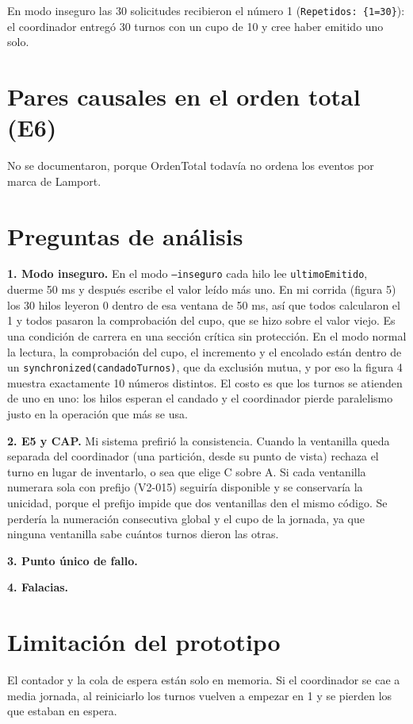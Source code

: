 \documentclass[11pt,a4paper]{article}
\begin{document}
En modo inseguro las 30 solicitudes recibieron el número 1 (\texttt{Repetidos: \{1=30\}}): el coordinador entregó 30 turnos con un cupo de 10 y cree haber emitido uno solo.

\section*{Pares causales en el orden total (E6)}

No se documentaron, porque OrdenTotal todavía no ordena los eventos por marca de Lamport.

\section*{Preguntas de análisis}

\textbf{1. Modo inseguro.} En el modo \texttt{--inseguro} cada hilo lee \texttt{ultimoEmitido}, duerme 50 ms y después escribe el valor leído más uno. En mi corrida (figura 5) los 30 hilos leyeron 0 dentro de esa ventana de 50 ms, así que todos calcularon el 1 y todos pasaron la comprobación del cupo, que se hizo sobre el valor viejo. Es una condición de carrera en una sección crítica sin protección. En el modo normal la lectura, la comprobación del cupo, el incremento y el encolado están dentro de un \texttt{synchronized(candadoTurnos)}, que da exclusión mutua, y por eso la figura 4 muestra exactamente 10 números distintos. El costo es que los turnos se atienden de uno en uno: los hilos esperan el candado y el coordinador pierde paralelismo justo en la operación que más se usa.

\textbf{2. E5 y CAP.} Mi sistema prefirió la consistencia. Cuando la ventanilla queda separada del coordinador (una partición, desde su punto de vista) rechaza el turno en lugar de inventarlo, o sea que elige C sobre A. Si cada ventanilla numerara sola con prefijo (V2-015) seguiría disponible y se conservaría la unicidad, porque el prefijo impide que dos ventanillas den el mismo código. Se perdería la numeración consecutiva global y el cupo de la jornada, ya que ninguna ventanilla sabe cuántos turnos dieron las otras.

\textbf{3. Punto único de fallo.} %

\textbf{4. Falacias.} %

\section*{Limitación del prototipo}

El contador y la cola de espera están solo en memoria. Si el coordinador se cae a media jornada, al reiniciarlo los turnos vuelven a empezar en 1 y se pierden los que estaban en espera.
\end{document}
